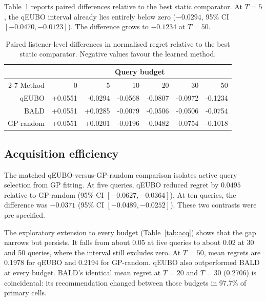 \documentclass[preprint,12pt]{elsarticle}
\begin{document}
Table~\ref{tab:curve} reports paired differences relative to the best static comparator. At $T=5$, the qEUBO interval already lies entirely below zero ($-0.0294$, 95\% CI $[-0.0470,-0.0123]$). The difference grows to $-0.1234$ at $T=50$.

\begin{table}[!htbp]
\centering
\caption{Paired listener-level differences in normalised regret relative to the best static comparator. Negative values favour the learned method.}
\label{tab:curve}
\begin{tabular}{rrrrrrr}
\toprule
 & \multicolumn{6}{c}{Query budget} \\
\cmidrule(lr){2-7}
Method & 0 & 5 & 10 & 20 & 30 & 50 \\
\midrule
qEUBO & +0.0551 & -0.0294 & -0.0568 & -0.0807 & -0.0972 & -0.1234 \\
BALD & +0.0551 & +0.0285 & -0.0079 & -0.0506 & -0.0506 & -0.0754 \\
GP-random & +0.0551 & +0.0201 & -0.0196 & -0.0482 & -0.0754 & -0.1018 \\
\bottomrule
\end{tabular}
\end{table}

\subsection{Acquisition efficiency}

The matched qEUBO-versus-GP-random comparison isolates active query selection from GP fitting. At five queries, qEUBO reduced regret by $0.0495$ relative to GP-random (95\% CI $[-0.0627,-0.0364]$). At ten queries, the difference was $-0.0371$ (95\% CI $[-0.0489,-0.0252]$). These two contrasts were pre-specified.

The exploratory extension to every budget (Table~\ref{tab:acq}) shows that the gap narrows but persists. It falls from about 0.05 at five queries to about 0.02 at 30 and 50 queries, where the interval still excludes zero. At $T=50$, mean regrets are 0.1978 for qEUBO and 0.2194 for GP-random. qEUBO also outperformed BALD at every budget. BALD's identical mean regret at $T=20$ and $T=30$ (0.2706) is coincidental: its recommendation changed between those budgets in 97.7\% of primary cells.
\end{document}
